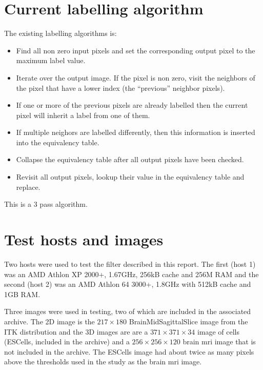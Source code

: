 \documentclass{InsightArticle}
\begin{document}
\section{Current labelling algorithm}
The existing labelling algorithms is:
\begin{itemize}
\item Find all non zero input pixels and set the corresponding output 
pixel to the maximum label value.
\item Iterate over the output image. If the pixel is non zero, visit 
the neighbors of the pixel that have a lower index (the ``previous''
neighbor pixels).
\item If one or more of the previous pixels are already labelled 
then the current pixel will inherit a label from one of them.
\item If multiple neighors are labelled differently, then this 
information is inserted into the equivalency table.
\item Collapse the equivalency table after all output pixels have 
been checked.
\item Revisit all output pixels, lookup their value in the equivalency table and replace.
\end{itemize}

This is a 3 pass algorithm.

\section{Test hosts and images}
Two hosts were used to test the filter described in this report. The
first (host 1) was an AMD Athlon XP 2000+, 1.67GHz, 256kB cache and
256M RAM and the second (host 2) was an AMD Athlon 64 3000+, 1.8GHz
with 512kB cache and 1GB RAM.

Three images were used in testing, two of which are included in the
associated archive. The 2D image is the $217 \times 180$
BrainMidSagittalSlice image from the ITK distribution and the 3D
images are are a $371 \times 371 \times 34$ image of cells (ESCells,
included in the archive) and a $256 \times 256 \times 120$ brain mri
image that is not included in the archive. The ESCells image had about
twice as many pixels above the thresholds used in the study as the
brain mri image.
\end{document}
